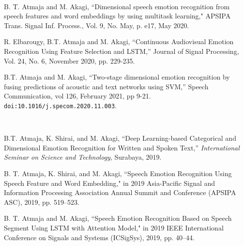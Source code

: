 

\renewcommand{\nomname}{PUBLICATIONS}
\markboth{\nomname}{\nomname}



\begin{publication}
\item[] \hspace{-1cm}{\LARGE\bf Journals} \\ 

\item 
B. T. Atmaja and M. Akagi, ``Dimensional speech emotion recognition from speech
features and word embeddings by using multitask learning," APSIPA Trans. Signal
Inf. Process., Vol. 9, No. May, p. e17, May 2020.

\item
R. Elbarougy, B.T. Atmaja and M. Akagi, ``Continuous Audiovisual Emotion
Recognition Using Feature Selection and LSTM,'' Journal of Signal Processing,
Vol. 24, No. 6, November 2020, pp. 229-235. 

\item
B.T. Atmaja and M. Akagi, ``Two-stage dimensional emotion recognition by fusing
predictions of acoustic and text networks using SVM,'' Speech Communication,
vol 126, February 2021, pp 9-21.
\verb|doi:10.1016/j.specom.2020.11.003|. \\

\item[] \hspace{-1cm}{\LARGE\bf International Conferences} \\ 

\item 
B.T. Atmaja, K. Shirai, and M. Akagi, ``Deep Learning-based Categorical and
Dimensional Emotion Recognition for Written and Spoken Text,''
\textit{International Seminar on Science and Technology}, Surabaya, 2019.

\item 
B. T. Atmaja, K. Shirai, and M. Akagi, ``Speech Emotion Recognition Using
Speech Feature and Word Embedding," in 2019 Asia-Pacific Signal and Information
Processing Association Annual Summit and Conference (APSIPA ASC), 2019, pp.
519--523.

\item
B. T. Atmaja and M. Akagi, ``Speech Emotion Recognition Based on Speech Segment
Using LSTM with Attention Model," in 2019 IEEE International Conference on
Signals and Systems (ICSigSys), 2019, pp. 40--44.


\end{publication}
